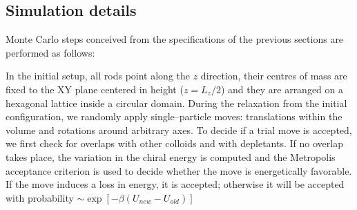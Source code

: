 

\subsection{Simulation details}
Monte Carlo steps conceived from the specifications of the previous sections are performed as follows:

In the initial setup, all rods point along the $z$ direction, their centres of mass are fixed to the XY plane centered in height ($z=L_z/2$) and they are arranged on a hexagonal lattice inside a circular domain. During the relaxation from the initial configuration, we randomly apply single--particle moves: translations within the volume and rotations around arbitrary axes. To decide if a trial move is accepted, we first check for overlaps with other colloids and with depletants. If no overlap takes place, the variation in the chiral energy is computed and the Metropolis acceptance criterion is used to decide whether the move is energetically favorable. If the move induces a loss in energy, it is accepted; otherwise it will be accepted with probability $\sim\exp{\left[-\beta(U_{new}-U_{old})\right]}$


